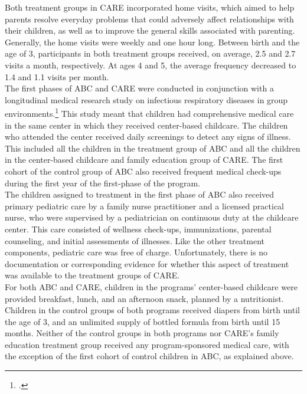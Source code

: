 \noindent Both treatment groups in CARE incorporated home visits, which aimed to help parents resolve everyday problems that could adversely affect relationships with their children, as well as to improve the general skills associated with parenting. Generally, the home visits were weekly and one hour long. Between birth and the age of 3, participants in both treatment groups received, on average, 2.5 and 2.7 visits a month, respectively. At ages 4 and 5, the average frequency decreased to 1.4 and 1.1 visits per month.\\ 

\noindent The first phases of ABC and CARE were conducted in conjunction with a longitudinal medical research study on infectious respiratory diseases in group environments.\footnote{\citet{Henderson-et-al_1982_NEJoM}.} This study meant that children had comprehensive medical care in the same center in which they received center-based childcare. The children who attended the center received daily screenings to detect any signs of illness. This included all the children in the treatment group of ABC and all the children in the center-based childcare and family education group of CARE. The first cohort of the control group of ABC also received frequent medical check-ups during the first year of the first-phase of the program.\\

\noindent The children assigned to treatment in the first phase of ABC also received primary pediatric care by a family nurse practitioner and a licensed practical nurse, who were supervised by a pediatrician on continuous duty at the childcare center. This care consisted of wellness check-ups, immunizations, parental counseling, and initial assessments of illnesses. Like the other treatment components, pediatric care was free of charge. Unfortunately, there is no documentation or corresponding evidence for whether this aspect of treatment was available to the treatment groups of CARE.\\

\noindent For both ABC and CARE, children in the programs' center-based childcare were provided breakfast, lunch, and an afternoon snack, planned by a nutritionist. Children in the control groups of both programs received diapers from birth until the age of 3, and an unlimited supply of bottled formula from birth until 15 months. Neither of the control groups in both programs nor CARE's family education treatment group received any program-sponsored medical care, with the exception of the first cohort of control children in ABC, as explained above.\\

